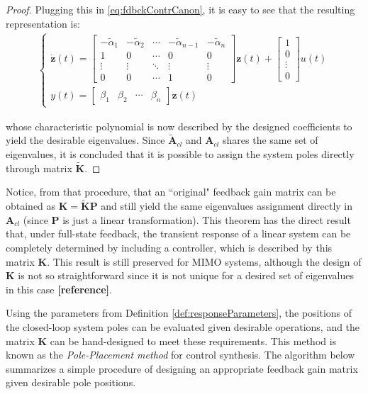 \documentclass[a4paper,11pt]{book}
\numberwithin{figure}{chapter}
\numberwithin{equation}{chapter}
\numberwithin{table}{chapter}
\theoremstyle{definition}
\begin{document}
\begin{proof}
	Plugging this in \eqref{eq:fdbckContrCanon}, it is easy to see that the resulting representation is:
	\begin{align} \label{eq:SSFdbckControlCanon}
	\begin{cases}
		\dot{\bm{z}}(t) = \begin{bmatrix}
			-\tilde{\alpha}_1 & -\tilde{\alpha}_2 & \cdots & -\tilde{\alpha}_{n-1} & -\tilde{\alpha}_n \\
			1 & 0 & \cdots & 0 & 0 \\
			\vdots & \vdots & \ddots & \vdots & \vdots \\
			0 & 0 & \cdots & 1 & 0 
		\end{bmatrix} \bm{z}(t) + \begin{bmatrix}
			1 \\ 0 \\ \vdots \\ 0
		\end{bmatrix} u(t) \\
		y(t) = \begin{bmatrix} \beta_1 & \beta_2 & \cdots & \beta_n \end{bmatrix} \bm{z}(t)
	\end{cases}
	\end{align} 
	
	\noindent whose characteristic polynomial is now described by the designed coefficients to yield the desirable eigenvalues. Since $\tilde{\bm{A}}_{cl}$ and $\bm{A}_{cl}$ shares the same set of eigenvalues, it is concluded that it is possible to assign the system poles directly through matrix $\tilde{\bm{K}}$.
\end{proof}

Notice, from that procedure, that an ``original" feedback gain matrix can be obtained as $\bm{K} = \tilde{\bm{K}} \bm{P}$ and still yield the same eigenvalues assignment directly in $\bm{A}_{cl}$ (since $\bm{P}$ is just a linear transformation). This theorem has the direct result that, under full-state feedback, the transient response of a linear system can be completely determined by including a controller, which is described by this matrix $\bm{K}$. This result is still preserved for MIMO systems, although the design of $\bm{K}$ is not so straightforward since it is not unique for a desired set of eigenvalues in this case \textbf{[reference]}. 

Using the parameters from Definition \ref{def:responseParameters}, the positions of the closed-loop system poles can be evaluated given desirable operations, and the matrix $\bm{K}$ can be hand-designed to meet these requirements. This method is known as the \textit{Pole-Placement method} for control synthesis. The algorithm below summarizes a simple procedure of designing an appropriate feedback gain matrix given desirable pole positions.
\end{document}
